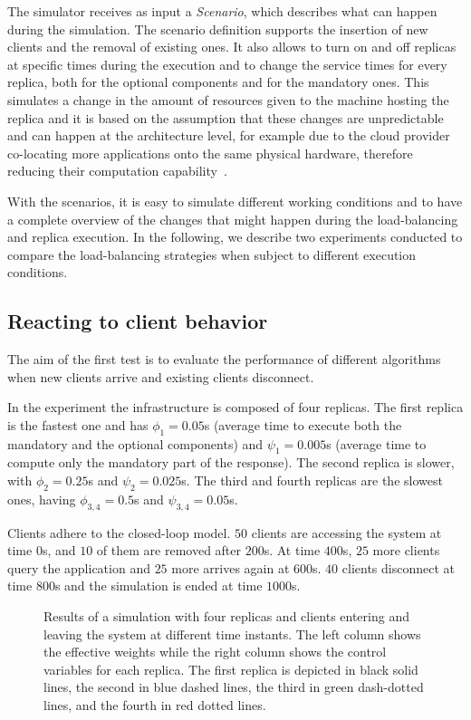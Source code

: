 The simulator receives as input a \emph{Scenario}, which describes
what can happen during the simulation. The scenario definition
supports the insertion of new clients and the removal of existing
ones. It also allows to turn on and off replicas at specific times
during the execution and to change the service times for every
replica, both for the optional components and for the mandatory
ones. This simulates a change in the amount of resources given to the
machine hosting the replica and it is based on the assumption that
these changes are unpredictable and can happen at the architecture
level, for example due to the cloud provider co-locating more
applications onto the same physical hardware, therefore reducing their
computation capability~\cite{Tomas13:CAC}.

With the scenarios, it is easy to simulate different working
conditions and to have a complete overview of the changes that might
happen during the load-balancing and replica execution. In the
following, we describe two experiments conducted to compare the
load-balancing strategies when subject to different execution
conditions.

\subsection{Reacting to client behavior}

The aim of the first test is to evaluate the performance of different
algorithms when new clients arrive and existing clients disconnect.

In the experiment the infrastructure is composed of four replicas. The
first replica is the fastest one and has $\phi_1 = 0.05$s (average
time to execute both the mandatory and the optional components) and
$\psi_1 = 0.005$s (average time to compute only the mandatory part of
the response). The second replica is slower, with $\phi_2 = 0.25$s and
$\psi_2 = 0.025$s. The third and fourth replicas are the slowest ones,
having $\phi_{3,4} = 0.5$s and $\psi_{3,4} = 0.05$s.

Clients adhere to the closed-loop model. $50$ clients are accessing
the system at time $0$s, and $10$ of them are removed after $200$s. At
time $400$s, $25$ more clients query the application and $25$ more
arrives again at $600$s. $40$ clients disconnect at time $800$s and
the simulation is ended at time $1000$s.

\begin{figure}[t!]
  \centering 
  \caption{Results of a simulation with four replicas and clients
    entering and leaving the system at different time instants. The
    left column shows the effective weights while the right column
    shows the control variables for each replica. The first replica is
    depicted in black solid lines, the second in blue dashed lines,
    the third in green dash-dotted lines, and the fourth in red dotted
    lines.}
    \vspace{-8mm}
\label{fig:clientchanges-full}
\end{figure}


